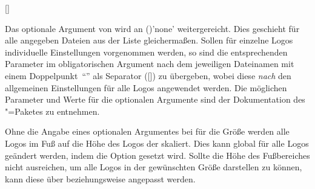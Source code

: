 \begin{Declaration*}{}
\begin{Declaration*}{}
\begin{Declaration*}{}
\begin{Declaration}[v2.03]{%
  [\LParameter{}]%
}
\begin{Declaration}[v2.03]{}
Das optionale Argument von  wird an 
()'none' weitergereicht. Dies 
geschieht für alle angegeben Dateien aus der Liste gleichermaßen. Sollen für 
einzelne Logos individuelle Einstellungen vorgenommen werden, so sind die 
entsprechenden Parameter im obligatorischen Argument nach dem jeweiligen 
Dateinamen mit einem Doppelpunkt~\enquote{\PValue{:}} als Separator 
([]) zu 
übergeben, wobei diese \emph{nach} den allgemeinen Einstellungen für alle Logos 
angewendet werden. Die möglichen Parameter und Werte für die optionalen 
Argumente sind der Dokumentation des "=Paketes zu entnehmen.
\end{Declaration}
\end{Declaration}

\begin{Declaration}[v2.05]{}%
\printdeclarationlist%
%
Ohne die Angabe eines optionalen Argumentes bei  für die Größe 
werden alle Logos im Fuß auf die Höhe des Logos der \TnUD skaliert. Dies kann 
global für alle Logos geändert werden, indem die Option 
 gesetzt wird. Sollte die Höhe des 
Fußbereiches nicht ausreichen, um alle Logos in der gewünschten Größe 
darstellen zu können, kann diese über  
beziehungsweise  angepasst werden.
\end{Declaration}


\end{Declaration*}
\end{Declaration*}
\end{Declaration*}
